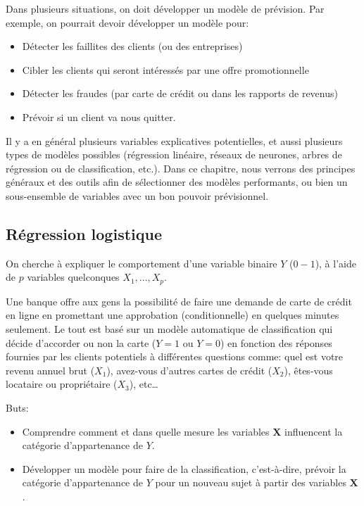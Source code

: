\documentclass[
]{book}
\providecommand{\tightlist}{%
  \setlength{\itemsep}{0pt}\setlength{\parskip}{0pt}}
\theoremstyle{definition}
\theoremstyle{definition}
\theoremstyle{definition}
\theoremstyle{remark}
\let\BeginKnitrBlock\begin \let\EndKnitrBlock\end
\begin{document}
Dans plusieurs situations, on doit développer un modèle de prévision. Par exemple, on pourrait devoir développer un modèle pour:

\begin{itemize}
\tightlist
\item
  Détecter les faillites des clients (ou des entreprises)
\item
  Cibler les clients qui seront intéressés par une offre promotionnelle
\item
  Détecter les fraudes (par carte de crédit ou dans les rapports de revenus)
\item
  Prévoir si un client va nous quitter.
\end{itemize}

Il y a en général plusieurs variables explicatives potentielles, et aussi plusieurs types de modèles possibles (régression linéaire, réseaux de neurones, arbres de régression ou de classification, etc.). Dans ce chapitre, nous verrons des principes généraux et des outils afin de sélectionner des modèles performants, ou bien un sous-ensemble de variables avec un bon pouvoir prévisionnel.

\hypertarget{ruxe9gression-logistique}{%
\subsection{Régression logistique}\label{ruxe9gression-logistique}}

On cherche à expliquer le comportement d'une variable binaire \(Y\) (\(0-1\)), à l'aide de \(p\) variables quelconques \(X_1, \ldots, X_p\).

\BeginKnitrBlock{example}
\protect\hypertarget{exm:unnamed-chunk-2}{}{\label{exm:unnamed-chunk-2} }Une banque offre aux gens la possibilité de faire une demande de carte de crédit en ligne en promettant une approbation (conditionnelle) en quelques minutes seulement. Le tout est basé sur un modèle automatique de classification qui décide d'accorder ou non la carte (\(Y=1\) ou \(Y=0\)) en fonction des réponses fournies par les clients potentiels à différentes questions comme: quel est votre revenu annuel brut (\(X_1\)), avez-vous d'autres cartes de crédit (\(X_2\)), êtes-vous locataire ou propriétaire (\(X_3\)), etc\ldots
\EndKnitrBlock{example}

Buts:

\begin{itemize}
\tightlist
\item
  Comprendre comment et dans quelle mesure les variables \(\boldsymbol{X}\) influencent la catégorie d'appartenance de \(Y\).
\item
  Développer un modèle pour faire de la classification, c'est-à-dire, prévoir la catégorie d'appartenance de \(Y\) pour un nouveau sujet à partir des variables \(\boldsymbol{X}\).
\end{itemize}
\end{document}

